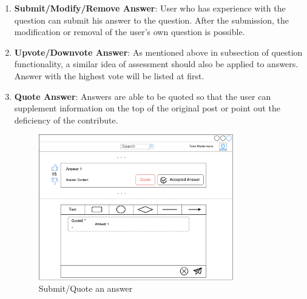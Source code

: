 \begin{enumerate}
\item
\textbf{Submit/Modify/Remove Answer}: User who has experience with the question can submit his answer to the question. After the submission, the modification or removal of the user's own question is possible.


\item
\textbf{Upvote/Downvote Answer}: As mentioned above in subsection of question functionality, a similar idea of assessment should also be applied to answers. Answer with the highest vote will be listed at first.


\item
\textbf{Quote Answer}: Answers are able to be quoted so that the user can supplement information on the top of the original post or point out the deficiency of the contribute.

\begin{figure}[!htbp]
  \centering
    \includegraphics[width=0.8\textwidth]{Figures/mockup/quote.pdf}
  \caption{Submit/Quote an answer}
\end{figure}

\end{enumerate}


